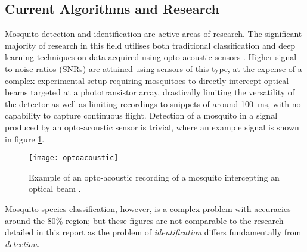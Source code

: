 
    
    \subsection{Current Algorithms and Research}
    \label{subsec:bg-litreview-currentalgs}
        Mosquito detection and identification are active areas of research. The significant majority of research in this field utilises both traditional classification and deep learning techniques on data acquired using opto-acoustic sensors \cite{Batista,Moore1991,Moore1986,Rahuman2016,Moore2002,Li2005,Chen2014,Silva2013}. Higher signal-to-noise ratios (SNRs) are attained using sensors of this type, at the expense of a complex experimental setup requiring mosquitoes to directly intercept optical beams targeted at a phototransistor array, drastically limiting the versatility of the detector as well as limiting recordings to snippets of around \SI{100}{ms}, with no capability to capture continuous flight. Detection of a mosquito in a signal produced by an opto-acoustic sensor is trivial, where an example signal is shown in figure \ref{fig:bg-litreview-currentalgs-opto}.
        \begin{figure}[ht]
            \centering
            \texttt{[image: optoacoustic]}
            \caption{Example of an opto-acoustic recording of a mosquito intercepting an optical beam \cite{Chen2014}.}
            \label{fig:bg-litreview-currentalgs-opto}
        \end{figure}
        Mosquito species classification, however, is a complex problem with accuracies around the $80\%$ region; but these figures are not comparable to the research detailed in this report as the problem of \textit{identification} differs fundamentally from \textit{detection}.
        
